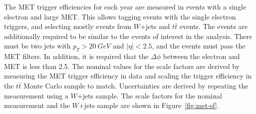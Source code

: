 The MET trigger efficiencies for each year are measured in events with a single electron and large MET.
This allows tagging events with the single electron triggers, and selecting mostly
events from $W$+jets and $t\bar{t}$ events.
The events are additionally required to be similar to the events of interest in the analysis.
There must be two jets with $p_T > \SI{20}{GeV}$ and $|\eta| < 2.5$,
and the events must pass the MET filters.
In addition, it is required that the $\Delta\phi$ between the electron and MET is less than 2.5.
The nominal values for the scale factors are derived by measuring
the MET trigger efficiency in data and scaling the trigger efficiency in
the $t\bar{t}$ Monte Carlo sample to match.
Uncertainties are derived by repeating the measurement using a $W$+jets sample.
The scale factors for the nominal measurement and the $W$+jets sample are shown in
Figure~\ref{fig:met-sf}.

